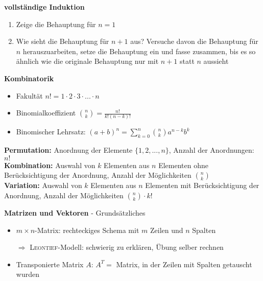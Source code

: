 \documentclass[10pt,landscape,a4paper]{article}
\begin{document}
\begin{multicols*}{4}
\begin{center}
	\normalsize{\textbf{vollständige Induktion}} \\
\end{center}
\begin{enumerate}[label=\arabic*.]
	\item Zeige die Behauptung für $n=1$
	\item Wie sieht die Behauptung für $n+1$ aus? Versuche davon die Behauptung für $n$ herauszuarbeiten, setze die Behauptung ein und fasse zusammen, bis es so ähnlich wie die originale Behauptung nur mit $n+1$ statt $n$ aussieht
\end{enumerate}

\begin{center}
	\normalsize{\textbf{Kombinatorik}} \\
\end{center}
\begin{itemize}
	\item Fakultät $n! = 1\cdot 2\cdot 3\cdot ... \cdot n$
	\item Binomialkoeffizient $\binom{n}{k} = \frac{n!}{k!(n-k)!}$
	\item Binomischer Lehrsatz: $(a+b)^n = \sum_{k=0}^{n}\binom{n}{k}a^{n-k}b^k$
\end{itemize}

\textbf{Permutation:} Anordnung der Elemente $\{1,2,...,n\}$, Anzahl der Anordnungen: $n!$\\
\textbf{Kombination:} Auswahl von $k$ Elementen aus $n$ Elementen ohne Berücksichtigung der Anordnung, Anzahl der Möglichkeiten $\binom{n}{k}$\\
\textbf{Variation:} Auswahl von $k$ Elementen aus $n$ Elementen mit Berücksichtigung der Anordnung, Anzahl der Möglichkeiten $\binom{n}{k}\cdot k!$

\begin{center}
	\normalsize{\textbf{Matrizen und Vektoren} - Grundsätzliches} \\
\end{center}
\begin{itemize}
	\item $m\times n$-Matrix: rechteckiges Schema mit $m$ Zeilen und $n$ Spalten
	\item[$\Rightarrow$] \textsc{Leontief}-Modell: schwierig zu erklären, Übung selber rechnen
	\item Transponierte Matrix $A$: $A^T =$ Matrix, in der Zeilen mit Spalten getauscht wurden
\end{itemize}


\end{multicols*}
\end{document}
